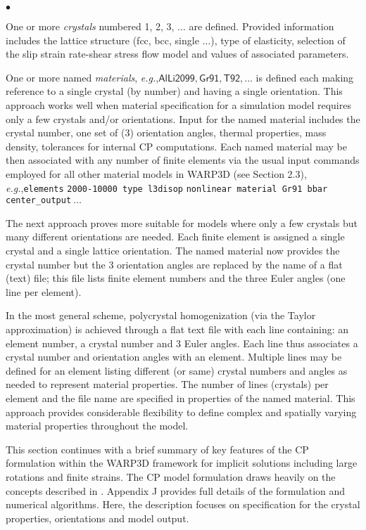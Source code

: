 \documentclass[11pt]{report}
\numberwithin{equation}{section}
\newcommand{\ttt} {\texttt}  %
\newcommand{\hv} {\mathsf}   %
\newcommand{\eg}{\emph{e.g.},\xspace}
\newcommand{\ti}{\emph}
\newcommand{\noi}{\noindent}
\newcommand{\squishlist}{
 \begin{list}{$\bullet$}
  { \setlength{\itemsep}{0pt}
     \setlength{\parsep}{3pt}
     \setlength{\topsep}{3pt}
     \setlength{\partopsep}{0pt}
     \setlength{\leftmargin}{1.5em}
     \setlength{\labelwidth}{1em}
     \setlength{\labelsep}{0.5em} } }
\newcommand{\squishend}{
  \end{list}  }
\begin{document}
 
 \small
\squishlist
%
\item One or more \ti{crystals} numbered 1, 2, 3, $\dots$  are defined. Provided 
information includes the lattice structure (fcc, bcc, single $\dots$), type of elasticity, 
selection of the slip strain rate-shear stress flow model and values of associated parameters.
%
\item One or more named \ti{materials}, \eg  $\hv{AlLi2099, 
Gr91, T92, ...}$ is defined each
making reference to a single crystal (by number) and having a single orientation. This 
approach works well when material specification
for a simulation model requires only a few crystals and/or orientations.
Input for the named material includes the crystal number, one set of (3) orientation 
angles, thermal properties, mass density, tolerances for internal CP computations. 
Each named material may be then associated
with any number of finite elements via the usual input commands employed for 
all other material models in WARP3D (see Section 2.3), \eg \ttt{elements} 
\ttt{2000-10000 type l3disop} \ttt{nonlinear  material Gr91 bbar center\_output}$\ \dots $
%
\item The next approach proves more suitable for models where only a few crystals 
but many different orientations are needed. Each finite element is assigned 
a single crystal and a single lattice orientation. The named material now provides the
crystal number but the 3 orientation angles 
are replaced by the 
name of a flat (text) file; this file lists finite element numbers and the 
three Euler angles (one line per element).
%
\item In the most general scheme, polycrystal homogenization
 (via the Taylor approximation) is achieved 
through a flat text file with each line containing: an element number, a crystal 
number and 3 Euler angles. Each line thus associates
a crystal number and orientation angles with an element. Multiple lines
may be defined for an element listing different (or same) crystal numbers
and angles as needed to represent material properties. The number of 
lines (crystals) per element and the file name are specified in 
properties of the named material. This approach 
provides considerable flexibility to define complex and spatially
varying material properties
throughout the model.
%
\squishend
\normalsize

 
 
\noi This section continues with a brief summary of key features of the CP formulation within the
WARP3D  framework for implicit solutions including large rotations and finite strains. The
CP model formulation draws heavily on the concepts described in \cite{KBT02,ABB03}. Appendix J
provides full details of the 
formulation and numerical algorithms. Here, the description focuses 
on specification for the crystal properties, orientations and model output.
\end{document}

